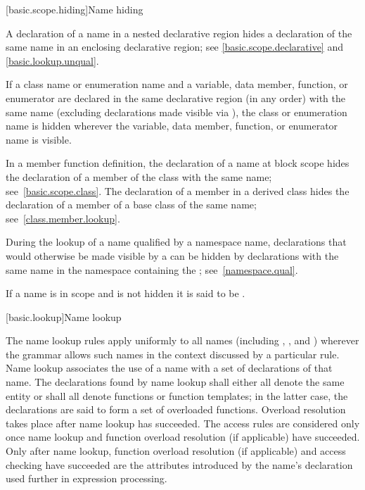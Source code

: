 [basic.scope.hiding]{Name hiding}

\pnum
{}%
%
%
A declaration of a name in a nested declarative region
hides a declaration of the same name in an enclosing declarative region;
see \ref{basic.scope.declarative} and \ref{basic.lookup.unqual}.

\pnum
{}%
If a class name or enumeration name and
a variable, data member, function, or enumerator
are declared in the same declarative region (in any order) with the
same name (excluding declarations made visible
via ),
the class or enumeration name is hidden wherever the variable, data member,
function, or enumerator name is visible.

\pnum
In a member function definition, the declaration of a name
at block scope
hides
the declaration of a member of the class with the same name;
see~\ref{basic.scope.class}. The declaration of a member in a derived
class hides the declaration of a member of
a base class of the same name; see~\ref{class.member.lookup}.

\pnum
During the lookup of a name qualified by a namespace name, declarations
that would otherwise be made visible by a  can
be hidden by declarations with the same name in the namespace containing
the ; see~\ref{namespace.qual}.

\pnum
{}%
If a name is in scope and is not hidden it is said to be .%

[basic.lookup]{Name lookup}%
%
%

\pnum
The name lookup rules apply uniformly to all names (including
,
, and
) wherever the grammar allows
such names in the context discussed by a particular rule. Name lookup
associates the use of a name with a set of declarations of
that name.
The declarations found by name lookup shall either all denote the same entity or
shall all denote functions or function templates;
in the latter case,
the declarations are said to form a set of overloaded
functions. Overload resolution
takes place after name lookup has succeeded. The access rules
are considered only once name lookup and
function overload resolution (if applicable) have succeeded. Only after
name lookup, function overload resolution (if applicable) and access
checking have succeeded are the attributes introduced by the name's
declaration used further in expression processing.

